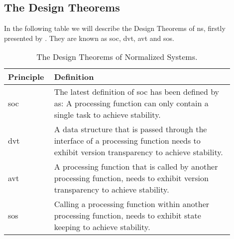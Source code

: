\subsection{The Design Theorems} \label{subsec_ns_desing_theorems}

In the following table we will describe the Design Theorems of \gls{ns}, firstly presented
by \textcite[111-119]{mannaert_normalized_2009}. They are known as \gls{soc}, \gls{dvt},
\gls{avt} and \gls{sos}.

\begin{table}[H]
    \begin{tabular}{ p{0.15\linewidth} p{0.75\linewidth}}
        \hline
        \textbf{Principle} & \textbf{Definition} \\ 
        \hline
        \acrshort*{soc} & The latest definition of \gls{soc} has been defined by
        \textcite[274]{mannaert_normalized_2016} as: A processing function can only contain a single task to achieve
        stability. \\
        
        \acrshort{dvt} &  A data structure that is passed through the interface of a processing function needs to
        exhibit version transparency to achieve stability.\\
        
        \acrshort{avt} & A processing function that is called by another processing function, needs to exhibit version
        transparency to achieve stability.\\
        
        \acrshort{sos} & Calling a processing function within another processing function, needs to exhibit state
        keeping to achieve stability.\\
        
        \bottomrule
    \end{tabular}
    \caption{The Design Theorems of Normalized Systems.}
    \label{ns_principles}
\end{table}